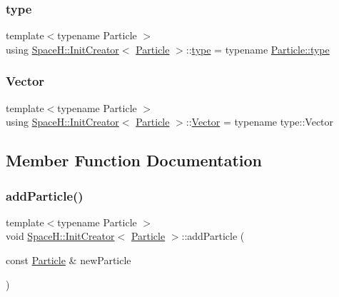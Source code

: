 \subsubsection{\texorpdfstring{type}{type}}
{\footnotesize\ttfamily template$<$typename Particle $>$ \\
using \mbox{\hyperlink{class_space_h_1_1_init_creator}{Space\+H\+::\+Init\+Creator}}$<$ \mbox{\hyperlink{struct_space_h_1_1_particle}{Particle}} $>$\+::\mbox{\hyperlink{class_space_h_1_1_init_creator_abe67b1be453e00e5ce5d84fe0755cf24}{type}} =  typename \mbox{\hyperlink{struct_space_h_1_1_particle_a4da7db09bcfc01d24c63468e6e08fa24}{Particle\+::type}}}

\mbox{\label{class_space_h_1_1_init_creator_ad355713fe020ed2c9fb0007cb4340340}} 
\subsubsection{\texorpdfstring{Vector}{Vector}}
{\footnotesize\ttfamily template$<$typename Particle $>$ \\
using \mbox{\hyperlink{class_space_h_1_1_init_creator}{Space\+H\+::\+Init\+Creator}}$<$ \mbox{\hyperlink{struct_space_h_1_1_particle}{Particle}} $>$\+::\mbox{\hyperlink{class_space_h_1_1_init_creator_ad355713fe020ed2c9fb0007cb4340340}{Vector}} =  typename type\+::\+Vector}



\subsection{Member Function Documentation}
\mbox{\label{class_space_h_1_1_init_creator_a3d0b62c72c0bd432ca93ec3ec60f6153}} 
\subsubsection{\texorpdfstring{add\+Particle()}{addParticle()}}
{\footnotesize\ttfamily template$<$typename Particle $>$ \\
void \mbox{\hyperlink{class_space_h_1_1_init_creator}{Space\+H\+::\+Init\+Creator}}$<$ \mbox{\hyperlink{struct_space_h_1_1_particle}{Particle}} $>$\+::add\+Particle (\begin{DoxyParamCaption}\item[{const \mbox{\hyperlink{struct_space_h_1_1_particle}{Particle}} \&}]{new\+Particle }\end{DoxyParamCaption})\hspace{0.3cm}{\ttfamily [inline]}}

